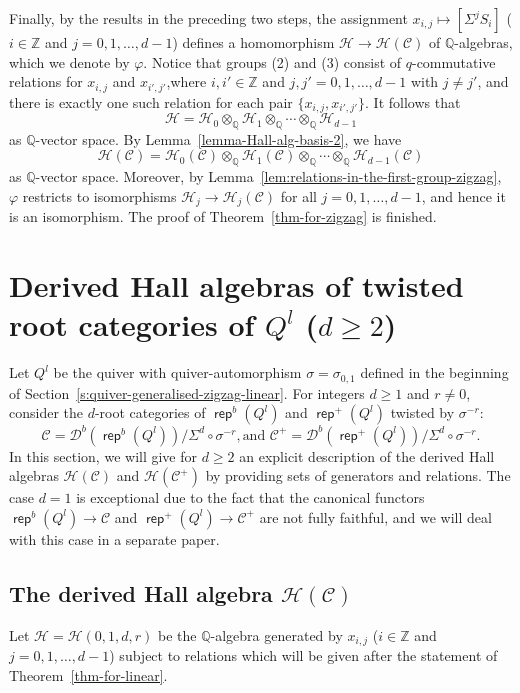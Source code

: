 \documentclass[reqno,12pt,a4paper]{amsart}
\theoremstyle{remark}
\theoremstyle{definition}
\newcommand{\opname}[1]{\operatorname{\mathsf{#1}}}
\newcommand{\rep}{\opname{rep}\nolimits}
\newcommand{\cc}{{\mathcal C}}
\newcommand{\cd}{{\mathcal D}}
\newcommand{\ch}{{\mathcal H}}
\numberwithin{equation}{section}
\begin{document}
\medskip
Finally, by the results in the preceding two steps, the assignment $x_{i,j}\mapsto [\Sigma^{j}S_i]$ ($i\in\mathbb{Z}$ and $j=0,1,\ldots,d-1$) defines a homomorphism $\ch\to\ch(\cc)$ of $\mathbb{Q}$-algebras, which we denote by $\varphi$.
Notice that groups (2) and (3) consist of $q$-commutative relations for $x_{i,j}$ and $x_{i',j'}$,where $i,i'\in\mathbb{Z}$ and $j,j'=0,1,\ldots,d-1$ with $j\neq j'$, and there is exactly one such relation for each pair $\{x_{i,j},x_{i',j'}\}$. It follows that
\[
\ch=\ch_0\otimes_{\mathbb{Q}}\ch_1\otimes_{\mathbb{Q}}\cdots\otimes_{\mathbb{Q}}\ch_{d-1}
\] as $\mathbb{Q}$-vector space. By Lemma~\ref{lemma-Hall-alg-basis-2}, we have
\[
\ch(\cc)=\ch_0(\cc)\otimes_\mathbb{Q}\ch_1(\cc)\otimes_\mathbb{Q}\cdots\otimes_\mathbb{Q}\ch_{d-1}(\cc)
\]
as $\mathbb{Q}$-vector space. Moreover, by Lemma~\ref{lem:relations-in-the-first-group-zigzag}, $\varphi$ restricts to isomorphisms $\ch_j\to\ch_j(\cc)$ for all $j=0,1,\ldots,d-1$, and hence it is an isomorphism. The proof of Theorem~\ref{thm-for-zigzag} is finished.



\section{Derived Hall algebras of twisted root categories of $Q^{l}$ ($d\geq 2$)}
\label{s:derived-Hall-of-linear}

Let $Q^{l}$ be the quiver with quiver-automorphism $\sigma=\sigma_{0,1}$ defined in the beginning of Section~\ref{s:quiver-generalised-zigzag-linear}. For integers $d\geq 1$ and $r\neq 0$, consider the $d$-root categories of $\rep^b(Q^{l})$ and $\rep^+(Q^{l})$ twisted by $\sigma^{-r}$:
\[
\cc=\cd^b(\rep^b(Q^{l}))/\Sigma^d\circ\sigma^{-r}, \text{and  }\cc^+=\cd^b(\rep^+(Q^{l}))/\Sigma^d\circ\sigma^{-r}.
\]
In this section, we will give for $d\geq 2$ an explicit description of the derived Hall algebras $\ch(\cc)$ and $\ch(\cc^+)$ by providing sets of generators and relations. The case $d=1$ is exceptional due to the fact that the canonical functors $\rep^b(Q^{l})\to\cc$ and $\rep^+(Q^{l})\to\cc^+$ are not fully faithful, and we will deal with this case in a separate paper.

\subsection{The derived Hall algebra $\ch(\cc)$}
\label{ss:derived-Hall-of-linear-bounded}
Let $\ch=\ch(0,1,d,r)$ be the $\mathbb{Q}$-algebra generated by $x_{i,j}$ ($i\in\mathbb{Z}$ and $j=0,1,\ldots,d-1$) subject to relations which will be given after the statement of Theorem~\ref{thm-for-linear}.
\end{document}
